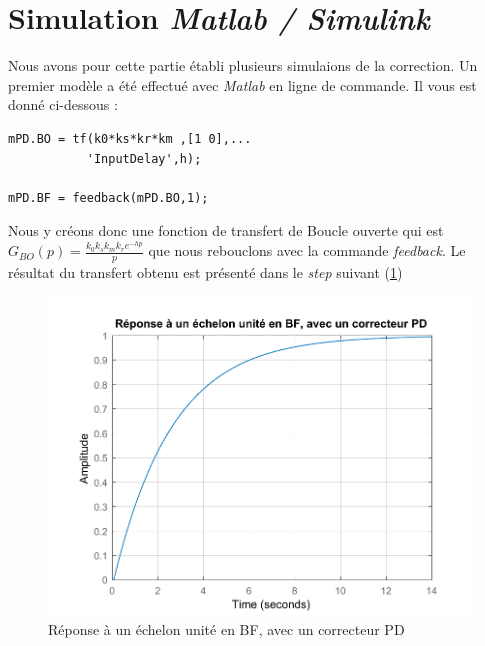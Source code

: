 \section{Simulation \emph{Matlab / Simulink}}
Nous avons pour cette partie établi plusieurs simulaions de la correction. Un premier modèle a été effectué avec \emph{Matlab} en ligne de commande. Il vous est donné ci-dessous :
\begin{lstlisting}
mPD.BO = tf(k0*ks*kr*km ,[1 0],...
           'InputDelay',h);

mPD.BF = feedback(mPD.BO,1);
\end{lstlisting}
Nous y créons donc une fonction de transfert de Boucle ouverte qui est $G_{BO}(p) = \frac{k_0k_sk_mk_re^{-hp}}{p}$ que nous rebouclons avec la commande \emph{feedback}. Le résultat du transfert obtenu est présenté dans le \emph{step} suivant (\ref{fig:repEchelonSimple})
\begin{figure}[!ht]
\centering
\includegraphics[width = .7\textwidth]{./II/images/rep_echelon_BF_simple.pdf}
\caption{Réponse à un échelon unité en BF, avec un correcteur PD}\label{fig:repEchelonSimple}
\end{figure}	



